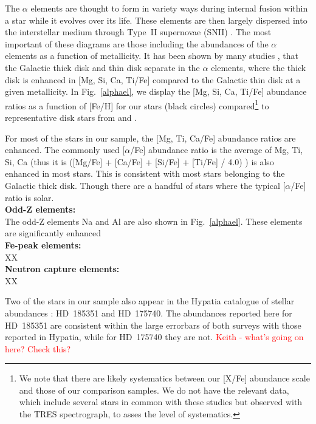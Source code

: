 \documentclass[a4paper,fleqn,usenatbib]{mnras}
\begin{document}
The $\alpha$ elements are thought to form in  variety ways during internal fusion within a star while it evolves over its life. These elements are then largely dispersed into the interstellar medium through Type~II supernovae (SNII) \citep{Matteucci2001}. The most important of these diagrams are those including the abundances of the $\alpha$ elements as a function of metallicity. It has been shown by many studies \citep[e.g.][and references therein]{Edvardsson1993, Adibekyan2012, Feltzing2013, Bensby2014}, that the Galactic thick disk and thin disk separate in the $\alpha$ elements, where the thick disk is enhanced in [Mg, Si, Ca, Ti/Fe] compared to the Galactic thin disk at a given metallicity. In Fig.~\ref{alphael}, we display the [Mg, Si, Ca, Ti/Fe] abundance ratios as a function of [Fe/H] for our stars (black circles) compared\footnote{We note that there are likely systematics between our [X/Fe] abundance scale and those of our comparison samples. We do not have the relevant data, which include several stars in common with these studies but observed with the TRES spectrograph, to asses the level of systematics.}  to representative disk stars from \cite[open red square,][]{Bensby2014} and \cite[open orange triangles,][]{Adibekyan2012}. 

For most of the stars in our sample, the [Mg, Ti, Ca/Fe] abundance ratios are enhanced. The commonly used [$\alpha$/Fe] abundance ratio is the average of Mg, Ti, Si, Ca (thus it is ([Mg/Fe] + [Ca/Fe] + [Si/Fe] + [Ti/Fe] / 4.0) ) is also enhanced in most stars. This is consistent with most stars belonging to the Galactic thick disk. Though there are a handful of stars where the typical [$\alpha$/Fe] ratio is solar. 
\\ 
{\bf Odd-Z elements:}\\
The odd-Z elements Na and Al are also shown in  Fig.~\ref{alphael}. These elements are significantly enhanced 
\\
{\bf Fe-peak elements:}\\
XX
\\ 
{\bf Neutron capture elements:}\\
XX




Two of the stars in our sample also appear in the Hypatia catalogue of stellar abundances \citep{hypatia}: HD~185351 and HD~175740. The abundances reported here for HD~185351 are consistent within the large errorbars of both surveys with those reported in Hypatia, while for HD~175740 they are not. \textcolor{red}{Keith - what's going on here? Check this?}
\end{document}
